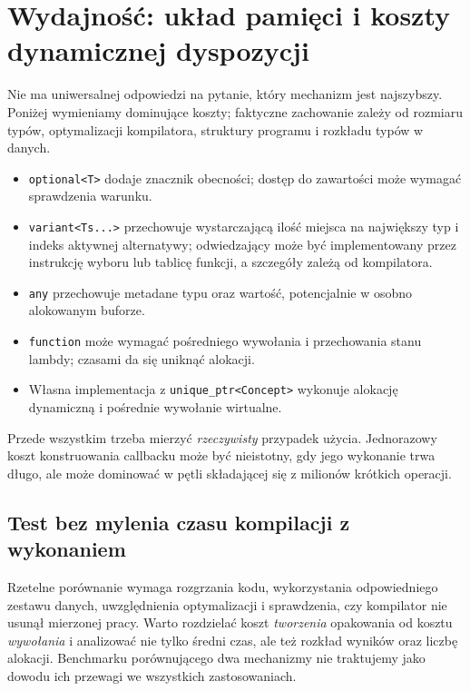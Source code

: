 \section{Wydajność: układ pamięci i koszty dynamicznej dyspozycji}
\label{sec:cpp14-performance}

Nie ma uniwersalnej odpowiedzi na pytanie, który mechanizm jest
najszybszy. Poniżej wymieniamy dominujące koszty; faktyczne zachowanie
zależy od rozmiaru typów, optymalizacji kompilatora, struktury programu
i rozkładu typów w danych.

\begin{itemize}
\item \texttt{optional<T>} dodaje znacznik obecności; dostęp do zawartości
      może wymagać sprawdzenia warunku.
\item \texttt{variant<Ts...>} przechowuje wystarczającą ilość miejsca
      na największy typ i indeks aktywnej alternatywy; odwiedzający
      może być implementowany przez instrukcję wyboru lub tablicę
      funkcji, a szczegóły zależą od kompilatora.
\item \texttt{any} przechowuje metadane typu oraz wartość, potencjalnie
      w osobno alokowanym buforze.
\item \texttt{function} może wymagać pośredniego wywołania i przechowania
      stanu lambdy; czasami da się uniknąć alokacji.
\item Własna implementacja z \texttt{unique\_ptr<Concept>} wykonuje
      alokację dynamiczną i pośrednie wywołanie wirtualne.
\end{itemize}

Przede wszystkim trzeba mierzyć \emph{rzeczywisty} przypadek użycia.
Jednorazowy koszt konstruowania callbacku może być nieistotny, gdy jego
wykonanie trwa długo, ale może dominować w pętli składającej się z
milionów krótkich operacji.

\subsection{Test bez mylenia czasu kompilacji z wykonaniem}

Rzetelne porównanie wymaga rozgrzania kodu, wykorzystania odpowiedniego
zestawu danych, uwzględnienia optymalizacji i sprawdzenia, czy kompilator
nie usunął mierzonej pracy. Warto rozdzielać koszt \emph{tworzenia}
opakowania od kosztu \emph{wywołania} i analizować nie tylko średni
czas, ale też rozkład wyników oraz liczbę alokacji. Benchmarku
porównującego dwa mechanizmy nie traktujemy jako dowodu ich przewagi
we wszystkich zastosowaniach.

